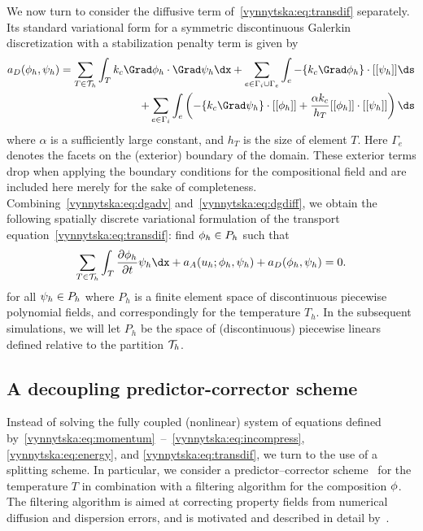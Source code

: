 We now turn to consider the diffusive term
of~\eqref{vynnytska:eq:transdif} separately. Its standard variational
form for a symmetric discontinuous Galerkin discretization with a
stabilization penalty term is given by~\citep{Arnold1982,
  KulkarniRovasTortorelli2007}
\begin{equation}
  \label{vynnytska:eq:dgdiff}
  \begin{split}
    a_D(\composition_h, \test_h)
    =
    \sum_{T \in \triang_h} \int_T k_c \Grad \composition_h \cdot \Grad \test_h \dx
    + \sum_{e \in \Gamma_i \cup \Gamma_e}
    \int_{e} - \avg{k_c \Grad \composition_h} \cdot \jump{\test_h} \ds \\
    + \sum_{e \in \Gamma_i} \int_{e} \left(
    - \{ k_c \Grad \test_h\} \cdot \jump{\composition_h}
    + \frac{\alpha k_c}{h_T} \jump{\composition_h} \cdot \jump{\test_h}
    \right) \ds
  \end{split}
\end{equation}
where $\alpha$ is a sufficiently large constant, and $h_T$ is the size
of element $T$. Here $\Gamma_e$ denotes the facets on the (exterior)
boundary of the domain. These exterior terms drop when applying the
boundary conditions for the compositional field and are included here
merely for the sake of completeness.
Combining~\eqref{vynnytska:eq:dgadv} and~\eqref{vynnytska:eq:dgdiff},
we obtain the following spatially discrete variational formulation of
the transport equation~\eqref{vynnytska:eq:transdif}: find
$\phi_h \in P_h$ such that
\begin{equation}
  \label{vynnytska:eq:semi_composition}
  \sum_{T \in \triang_h} \int_T \frac{\partial \composition_h}{\partial t}\test_h\dx
  + a_{A} (u_h; \composition_h, \test_h) + a_D(\composition_h, \test_h) = 0.
\end{equation}
for all $\psi_h \in P_h$ where $P_h$ is a finite element space of
discontinuous piecewise polynomial fields, and correspondingly for the
temperature $T_h$. In the subsequent simulations, we will let $P_h$ be
the space of (discontinuous) piecewise linears defined relative to the
partition $\mathcal{T}_h$.

\subsection{A decoupling predictor-corrector scheme}

Instead of solving the fully coupled (nonlinear) system of equations
defined
by~\eqref{vynnytska:eq:momentum}~--~\eqref{vynnytska:eq:incompress},
\eqref{vynnytska:eq:energy}, and \eqref{vynnytska:eq:transdif}, we
turn to the use of a splitting scheme. In particular, we consider a
predictor--corrector scheme~\citep{BergKekenYuen1993, HansenEbel1988}
for the temperature $T$ in combination with a filtering algorithm for
the composition $\phi$. The filtering algorithm is aimed at
correcting property fields from numerical diffusion and dispersion
errors, and is motivated and described in detail
by~\citet{LenardicKaula1993}.

